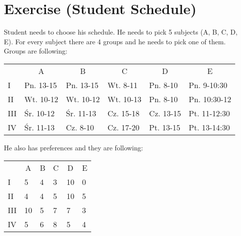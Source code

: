 
\section{Exercise (Student Schedule)}
Student needs to choose his schedule. He needs to pick 5 subjects (A, B, C, D, E). For every subject there are 4 groups and he needs to pick one of them.
Groups are following:
\begin{table}[H]
    \centering

    \begin{tabular}{lccccc}
        & A                              & B                              & C                              & D                              & E                                 \\ \cline{2-6} 
\multicolumn{1}{l|}{I}   & \multicolumn{1}{l|}{Pn. 13-15} & \multicolumn{1}{l|}{Pn. 13-15} & \multicolumn{1}{l|}{Wt. 8-11}  & \multicolumn{1}{l|}{Pn. 8-10}  & \multicolumn{1}{l|}{Pn. 9-10:30}  \\ \cline{2-6} 
\multicolumn{1}{l|}{II}  & \multicolumn{1}{l|}{Wt. 10-12} & \multicolumn{1}{l|}{Wt. 10-12} & \multicolumn{1}{l|}{Wt. 10-13} & \multicolumn{1}{l|}{Pn. 8-10}  & \multicolumn{1}{l|}{Pn. 10:30-12} \\ \cline{2-6} 
\multicolumn{1}{l|}{III} & \multicolumn{1}{l|}{Śr. 10-12} & \multicolumn{1}{l|}{Śr. 11-13} & \multicolumn{1}{l|}{Cz. 15-18} & \multicolumn{1}{l|}{Cz. 13-15} & \multicolumn{1}{l|}{Pt. 11-12:30} \\ \cline{2-6} 
\multicolumn{1}{l|}{IV}  & \multicolumn{1}{l|}{Śr. 11-13} & \multicolumn{1}{l|}{Cz. 8-10}  & \multicolumn{1}{l|}{Cz. 17-20} & \multicolumn{1}{l|}{Pt. 13-15} & \multicolumn{1}{l|}{Pt. 13-14:30} \\ \cline{2-6} 
\end{tabular}
    \label{GroupHours}
\end{table}
He also has preferences and they are following:
\begin{table}[H]
    \centering

    \begin{tabular}{lccccc}
        & A                              & B                              & C                              & D                              & E                                 \\ \cline{2-6} 
\multicolumn{1}{l|}{I}   & \multicolumn{1}{l|}{5} & \multicolumn{1}{l|}{4} & \multicolumn{1}{l|}{3}  & \multicolumn{1}{l|}{10}  & \multicolumn{1}{l|}{0}  \\ \cline{2-6} 
\multicolumn{1}{l|}{II}  & \multicolumn{1}{l|}{4} & \multicolumn{1}{l|}{4} & \multicolumn{1}{l|}{5} & \multicolumn{1}{l|}{10}  & \multicolumn{1}{l|}{5} \\ \cline{2-6} 
\multicolumn{1}{l|}{III} & \multicolumn{1}{l|}{10} & \multicolumn{1}{l|}{5} & \multicolumn{1}{l|}{7} & \multicolumn{1}{l|}{7} & \multicolumn{1}{l|}{3} \\ \cline{2-6} 
\multicolumn{1}{l|}{IV}  & \multicolumn{1}{l|}{5} & \multicolumn{1}{l|}{6}  & \multicolumn{1}{l|}{8} & \multicolumn{1}{l|}{5} & \multicolumn{1}{l|}{4} \\ \cline{2-6} 
\end{tabular}
    \label{GroupPreference}
\end{table}
